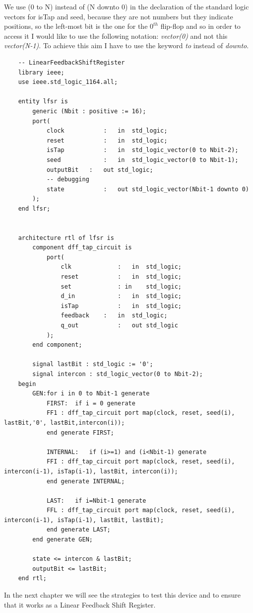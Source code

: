 \documentclass[a4paper]{report}
\begin{document}
\noindent We use (0 to N) instead of (N downto 0) in the declaration of the standard logic vectors for isTap and seed, because they are not numbers but they indicate positions, so the left-most bit is the one for the $0^{th}$ flip-flop and so in order to access it I would like to use the following notation: \emph{vector(0)} and not this \emph{vector(N-1)}. To achieve this aim I have to use the keyword \emph{to} instead of \emph{downto}.
\begin{lstlisting}
	-- LinearFeedbackShiftRegister
	library ieee;
	use ieee.std_logic_1164.all;
	
	entity lfsr is
		generic (Nbit : positive := 16);
		port(
			clock			:	in 	std_logic;
			reset			:	in 	std_logic;
			isTap			:	in 	std_logic_vector(0 to Nbit-2);
			seed			:	in 	std_logic_vector(0 to Nbit-1);
			outputBit	:	out std_logic;
			-- debugging
			state			:	out std_logic_vector(Nbit-1 downto 0)
		);
	end lfsr;
	
	
	architecture rtl of lfsr is
		component dff_tap_circuit is
			port(
				clk				:	in 	std_logic;
				reset			:	in 	std_logic;
				set				: in 	std_logic; 
				d_in			:	in 	std_logic;	
				isTap			:	in 	std_logic;
				feedback	:	in 	std_logic;
				q_out			:	out std_logic
			);
		end component;
		
		signal lastBit : std_logic := '0';
		signal intercon : std_logic_vector(0 to Nbit-2);
	begin
		GEN:for i in 0 to Nbit-1 generate
			FIRST: 	if i = 0 generate
			FF1 : dff_tap_circuit port map(clock, reset, seed(i), lastBit,'0', lastBit,intercon(i));
			end generate FIRST;
			
			INTERNAL:	if (i>=1) and (i<Nbit-1) generate
			FFI : dff_tap_circuit port map(clock, reset, seed(i), intercon(i-1), isTap(i-1), lastBit, intercon(i));
			end generate INTERNAL;
			
			LAST:	if i=Nbit-1 generate
			FFL : dff_tap_circuit port map(clock, reset, seed(i), intercon(i-1), isTap(i-1), lastBit, lastBit);
			end generate LAST;
		end generate GEN;
		
		state <= intercon & lastBit;
		outputBit <= lastBit;
	end rtl;
\end{lstlisting}
In the next chapter we will see the strategies to test this device and to ensure that it works as a Linear Feedback Shift Register.
\end{document}
